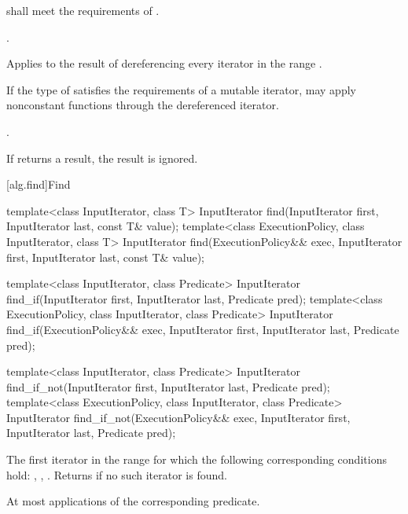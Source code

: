 \begin{itemdescr}
\pnum
\requires
{} shall meet the requirements of .

\pnum
\requires
{}.

\pnum
\effects
Applies  to the result of dereferencing every iterator in the range
.
\begin{note}
If the type of  satisfies the requirements of a mutable iterator,
 may apply nonconstant functions through the dereferenced iterator.
\end{note}

\pnum
\returns
{}.

\pnum
\remarks
If  returns a result, the result is ignored.
\end{itemdescr}

[alg.find]{Find}

%
%
%
\begin{itemdecl}
template<class InputIterator, class T>
  InputIterator find(InputIterator first, InputIterator last,
                     const T& value);
template<class ExecutionPolicy, class InputIterator, class T>
  InputIterator find(ExecutionPolicy&& exec, InputIterator first, InputIterator last,
                     const T& value);

template<class InputIterator, class Predicate>
  InputIterator find_if(InputIterator first, InputIterator last,
                        Predicate pred);
template<class ExecutionPolicy, class InputIterator, class Predicate>
  InputIterator find_if(ExecutionPolicy&& exec, InputIterator first, InputIterator last,
                        Predicate pred);

template<class InputIterator, class Predicate>
  InputIterator find_if_not(InputIterator first, InputIterator last,
                            Predicate pred);
template<class ExecutionPolicy, class InputIterator, class Predicate>
  InputIterator find_if_not(ExecutionPolicy&& exec, InputIterator first, InputIterator last,
                            Predicate pred);
\end{itemdecl}

\begin{itemdescr}
\pnum
\returns
The first iterator
in the range
for which the following corresponding
conditions hold:
, , .
Returns  if no such iterator is found.

\pnum
\complexity
At most
applications of the corresponding predicate.
\end{itemdescr}

